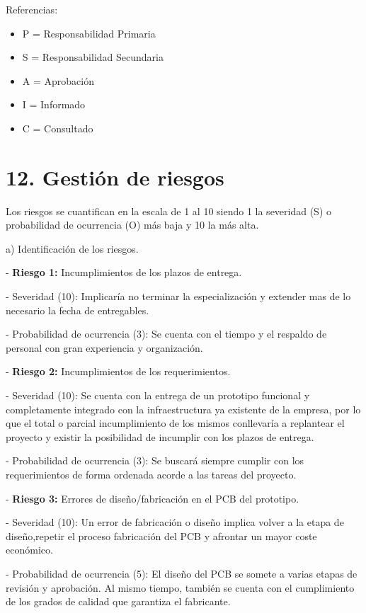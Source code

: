 \documentclass[11pt]{charter}
\begin{document}
Referencias:
\begin{itemize}
	\item P = Responsabilidad Primaria
	\item S = Responsabilidad Secundaria
	\item A = Aprobación
	\item I = Informado
	\item C = Consultado
\end{itemize}



\section{12. Gestión de riesgos}
\label{sec:riesgos}

Los riesgos se cuantifican en la escala de 1 al 10 siendo 1 la severidad (S)
o probabilidad de ocurrencia (O) más baja y 10 la más alta.

a) Identificación de los riesgos. 

	
- \textbf{Riesgo 1:} Incumplimientos de los plazos de entrega.
	
	- Severidad (10): Implicaría no terminar la especialización y extender mas de lo necesario la fecha de entregables.
	
	- Probabilidad de ocurrencia (3): Se cuenta con el tiempo y el respaldo de personal con gran experiencia y organización.

- \textbf{Riesgo 2:} Incumplimientos de los requerimientos.
	
	- Severidad (10): Se cuenta con la entrega de un prototipo funcional y completamente integrado con la infraestructura ya existente de la empresa, por lo que el total o parcial incumplimiento de los mismos conllevaría a replantear el proyecto y existir la posibilidad de incumplir con los plazos de entrega. 
	
	- Probabilidad de ocurrencia (3): Se buscará siempre cumplir con los requerimientos de forma ordenada acorde a las tareas del proyecto.  
	
- \textbf{Riesgo 3:} Errores de diseño/fabricación en el PCB del prototipo.
	
	- Severidad (10): Un error de fabricación o diseño implica volver a la etapa de diseño,repetir el proceso fabricación del PCB y afrontar un mayor coste económico. 
	
	- Probabilidad de ocurrencia (5): El diseño del PCB se somete a varias etapas de revisión y aprobación. Al mismo tiempo, también se cuenta con el cumplimiento de los grados de calidad que garantiza el fabricante.  
	
\end{document}
